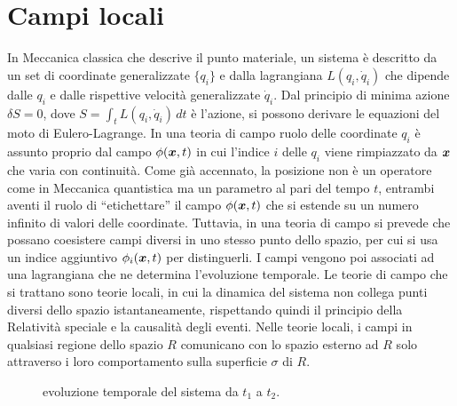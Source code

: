 \chapter{Campi locali}
In Meccanica classica che descrive il punto materiale, un sistema è descritto da un set di coordinate generalizzate $\{q_i\}$ e dalla lagrangiana $L(q_i,\dot{q}_i)$ che dipende dalle $q_i$ e dalle rispettive velocità generalizzate $\dot{q}_i$. Dal principio di minima azione $\delta S = 0$, dove $S = \int_{t}L(q_i,\dot{q}_i)\,dt$ è l'azione, si possono derivare le equazioni del moto di Eulero-Lagrange. In una teoria di campo ruolo delle coordinate $q_i$ è assunto proprio dal campo $\phi(\bm{x},t)$ in cui l'indice $i$ delle $q_i$ viene rimpiazzato da $\bm{x}$ che varia con continuità. Come già accennato, la posizione non è un operatore come in Meccanica quantistica ma un parametro al pari del tempo $t$, entrambi aventi il ruolo di ``etichettare'' il campo $\phi(\bm{x},t)$ che si estende su un numero infinito di valori delle coordinate. Tuttavia, in una teoria di campo si prevede che possano coesistere campi diversi in uno stesso punto dello spazio, per cui si usa un indice aggiuntivo $\phi_i(\bm{x},t)$ per distinguerli. I campi vengono poi associati ad una lagrangiana che ne determina l'evoluzione temporale. Le teorie di campo che si trattano sono teorie locali, in cui la dinamica del sistema non collega punti diversi dello spazio istantaneamente, rispettando quindi il principio della Relatività speciale e la causalità degli eventi. Nelle teorie locali, i campi in qualsiasi regione dello spazio $R$ comunicano con lo spazio esterno ad $R$ solo attraverso i loro comportamento sulla superficie $\sigma$ di $R$. 
\begin{figure}[h]
    \centering
    \caption{evoluzione temporale del sistema da $t_1$ a $t_2$.}
    \label{fig: evoluzione temporale}
\end{figure}
